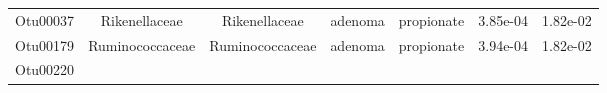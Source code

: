 \documentclass[11pt,]{article}
\begin{document}
\begin{longtable}[]{@{}ccccccc@{}}
\begin{minipage}[t]{0.09\columnwidth}\centering\strut
Otu00037\strut
\end{minipage} & \begin{minipage}[t]{0.17\columnwidth}\centering\strut
Rikenellaceae\strut
\end{minipage} & \begin{minipage}[t]{0.17\columnwidth}\centering\strut
Rikenellaceae\strut
\end{minipage} & \begin{minipage}[t]{0.09\columnwidth}\centering\strut
adenoma\strut
\end{minipage} & \begin{minipage}[t]{0.11\columnwidth}\centering\strut
propionate\strut
\end{minipage} & \begin{minipage}[t]{0.09\columnwidth}\centering\strut
3.85e-04\strut
\end{minipage} & \begin{minipage}[t]{0.09\columnwidth}\centering\strut
1.82e-02\strut
\end{minipage}\tabularnewline
\begin{minipage}[t]{0.09\columnwidth}\centering\strut
Otu00179\strut
\end{minipage} & \begin{minipage}[t]{0.17\columnwidth}\centering\strut
Ruminococcaceae\strut
\end{minipage} & \begin{minipage}[t]{0.17\columnwidth}\centering\strut
Ruminococcaceae\strut
\end{minipage} & \begin{minipage}[t]{0.09\columnwidth}\centering\strut
adenoma\strut
\end{minipage} & \begin{minipage}[t]{0.11\columnwidth}\centering\strut
propionate\strut
\end{minipage} & \begin{minipage}[t]{0.09\columnwidth}\centering\strut
3.94e-04\strut
\end{minipage} & \begin{minipage}[t]{0.09\columnwidth}\centering\strut
1.82e-02\strut
\end{minipage}\tabularnewline
\begin{minipage}[t]{0.09\columnwidth}\centering\strut
Otu00220\strut
\end{minipage} & \begin{minipage}[t]{0.17\columnwidth}\centering\strut

\end{minipage}
\end{longtable}
\end{document}
